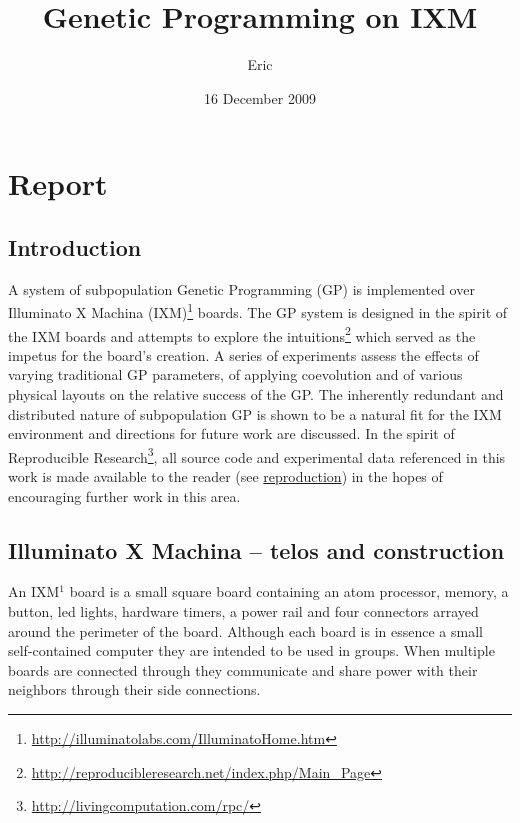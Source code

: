 \documentclass[11pt]{article}
\title{Genetic Programming on IXM}
\author{Eric}
\date{16 December 2009}
\begin{document}
\maketitle



\section*{Report}
\label{sec-1}

\subsection*{Introduction}
\label{sec-1.1}

A system of subpopulation Genetic Programming (GP) is implemented over
Illuminato X Machina (IXM)\footnote{\href{http://illuminatolabs.com/IlluminatoHome.htm}{http://illuminatolabs.com/IlluminatoHome.htm} } boards.  The GP system is designed in
the spirit of the IXM boards and attempts to explore the
intuitions\footnote{\href{http://reproducibleresearch.net/index.php/Main_Page}{http://reproducibleresearch.net/index.php/Main\_Page} } which served as the impetus for the board's creation.
A series of experiments assess the effects of varying traditional GP
parameters, of applying coevolution and of various physical layouts on
the relative success of the GP.  The inherently redundant and
distributed nature of subpopulation GP is shown to be a natural fit
for the IXM environment and directions for future work are discussed.
In the spirit of Reproducible Research\footnote{\href{http://livingcomputation.com/rpc/}{http://livingcomputation.com/rpc/} }, all source code and
experimental data referenced in this work is made available to the
reader (see \hyperref[sec-1.8]{reproduction}) in the hopes of encouraging further work in
this area.

\subsection*{Illuminato X Machina -- telos and construction}
\label{sec-1.2}

An IXM$^{1}$ board is a small square board containing an atom
processor, memory, a button, led lights, hardware timers, a power rail
and four connectors arrayed around the perimeter of the board.
Although each board is in essence a small self-contained computer they
are intended to be used in groups.  When multiple boards are connected
through they communicate and share power with their neighbors through
their side connections.
\end{document}
